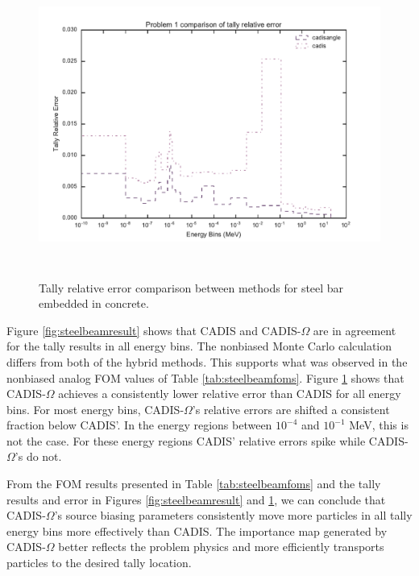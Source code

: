 \begin{figure}[h!]
  \centering
  \includegraphics[height=10cm]{./chapters/characterization_probs/figures/char/prob_1/problem_1_tally_error_compare.pdf}
  \caption[Tally relative error comparison between methods for steel bar
  embedded in concrete.]
  {Tally relative error comparison between methods for steel bar embedded in
  concrete.}
  \label{fig:steelbeamerror}
\end{figure}

Figure \ref{fig:steelbeamresult} shows that CADIS and CADIS-$\Omega$ are in
agreement for the tally results in all energy bins. The nonbiased Monte Carlo
calculation differs from both of the hybrid methods. This supports what was
observed in the nonbiased analog FOM values of Table \ref{tab:steelbeamfoms}.
Figure
\ref{fig:steelbeamerror} shows that CADIS-$\Omega$ achieves a
consistently lower relative error than CADIS for all energy bins. For most
energy bins, CADIS-$\Omega$'s relative errors are shifted a consistent fraction
below CADIS'. In the energy regions between $10^{-4}$ and $10^{-1}$ MeV, this is
not the case. For these energy regions CADIS' relative errors spike while
CADIS-$\Omega$'s do not.

%
%

From the FOM results presented in Table \ref{tab:steelbeamfoms} and the tally
results and error in Figures \ref{fig:steelbeamresult} and
\ref{fig:steelbeamerror}, we can conclude that
CADIS-$\Omega$'s source biasing parameters consistently move more particles in
all tally energy bins more effectively than CADIS.
The importance map generated by CADIS-$\Omega$
better reflects the problem physics and more efficiently transports particles to
the desired tally location.

